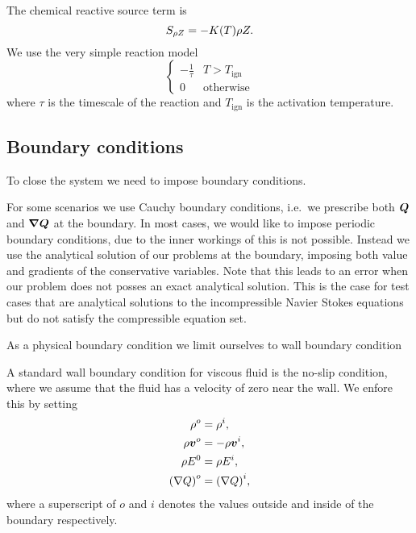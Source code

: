 \newcommand{\reactionTimescale}{\tau}
\newcommand{\reactionTemperature}{T_{\text{ign}}}
The chemical reactive source term is
\begin{equation}\label{eq:source-reaction}
  \source[\QZ] = - K(T) \QZ.
\end{equation}
We use the very simple reaction model
\begin{equation}\label{eq:reaction-model}
\begin{cases}
  - \frac{1}{\reactionTimescale} & T > \reactionTemperature\\
  0 & \text{otherwise}
\end{cases}  
\end{equation}
where $\reactionTimescale$ is the timescale of the reaction and $\reactionTemperature$ is the activation temperature.

\subsection{Boundary conditions}
To close the system we need to impose boundary conditions.

For some scenarios we use Cauchy boundary conditions, i.e.\ we prescribe both $\bm{Q}$ and $\gradQ$ at the boundary.
In most cases, we would like to impose periodic boundary conditions, due to the inner workings of \exahype{} this is not possible.
Instead we use the analytical solution of our problems at the boundary, imposing both value and gradients of the conservative variables.
Note that this leads to an error when our problem does not posses an exact analytical solution.
This is the case for test cases that are analytical solutions to the incompressible Navier Stokes equations but do not satisfy the compressible equation set.

As a physical boundary condition we limit ourselves to wall boundary condition

A standard wall boundary condition for viscous fluid is the no-slip condition, where we assume that the fluid has a velocity of zero near the wall.
We enfore this by setting
\begin{align}
  \label{eq:no-slip}
  \begin{split}
  \rho^o &= \rho^i, \\
  \rho \bm{v}^o &= -\rho \bm{v}^i, \\
  \rho E^0 &= \rho E^i,\\
  {(\nabla Q)}^o &= {(\nabla Q)}^i,
  \end{split}
\end{align}
where a superscript of $o$ and $i$ denotes the values outside and inside of the boundary respectively.

